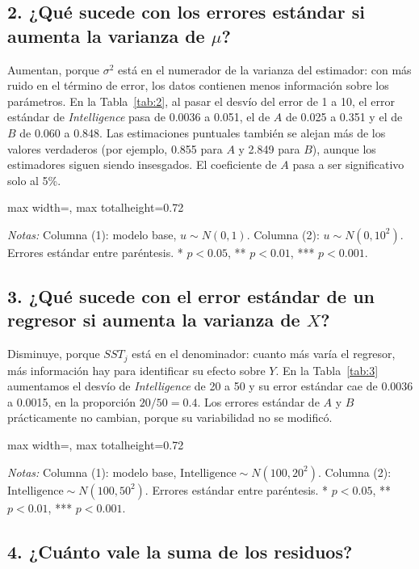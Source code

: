 \documentclass[11pt,a4paper]{article}
\newcommand{\tabla}[1]{\begin{adjustbox}{max width=\linewidth, max totalheight=0.72\textheight}\end{adjustbox}}
\newcommand{\notas}[1]{\par\vspace{0.3em}\begin{minipage}{0.92\linewidth}\footnotesize\textit{Notas:} #1\end{minipage}}
\begin{document}
\subsection*{2. ¿Qué sucede con los errores estándar si aumenta la varianza de $\mu$?}

Aumentan, porque $\sigma^2$ está en el numerador de la varianza del estimador: con más ruido en el término de error, los datos contienen menos información sobre los parámetros. En la Tabla~\ref{tab:2}, al pasar el desvío del error de 1 a 10, el error estándar de \textit{Intelligence} pasa de 0.0036 a 0.051, el de $A$ de 0.025 a 0.351 y el de $B$ de 0.060 a 0.848. Las estimaciones puntuales también se alejan más de los valores verdaderos (por ejemplo, 0.855 para $A$ y 2.849 para $B$), aunque los estimadores siguen siendo insesgados. El coeficiente de $A$ pasa a ser significativo solo al 5\%.

\begin{table}[H]\centering
\caption{Aumento de la varianza del término de error}\label{tab:2}
\tabla{"../output/Tabla 2.tex"}
\notas{Columna (1): modelo base, $u\sim N(0,1)$. Columna (2): $u\sim N(0,10^2)$. Errores estándar entre paréntesis. * $p<0.05$, ** $p<0.01$, *** $p<0.001$.}
\end{table}

\subsection*{3. ¿Qué sucede con el error estándar de un regresor si aumenta la varianza de $X$?}

Disminuye, porque $SST_j$ está en el denominador: cuanto más varía el regresor, más información hay para identificar su efecto sobre $Y$. En la Tabla~\ref{tab:3} aumentamos el desvío de \textit{Intelligence} de 20 a 50 y su error estándar cae de 0.0036 a 0.0015, en la proporción $20/50=0.4$. Los errores estándar de $A$ y $B$ prácticamente no cambian, porque su variabilidad no se modificó.

\begin{table}[H]\centering
\caption{Aumento de la varianza de un regresor}\label{tab:3}
\tabla{"../output/Tabla 3.tex"}
\notas{Columna (1): modelo base, $\text{Intelligence}\sim N(100,20^2)$. Columna (2): $\text{Intelligence}\sim N(100,50^2)$. Errores estándar entre paréntesis. * $p<0.05$, ** $p<0.01$, *** $p<0.001$.}
\end{table}

\subsection*{4. ¿Cuánto vale la suma de los residuos?}
\end{document}
